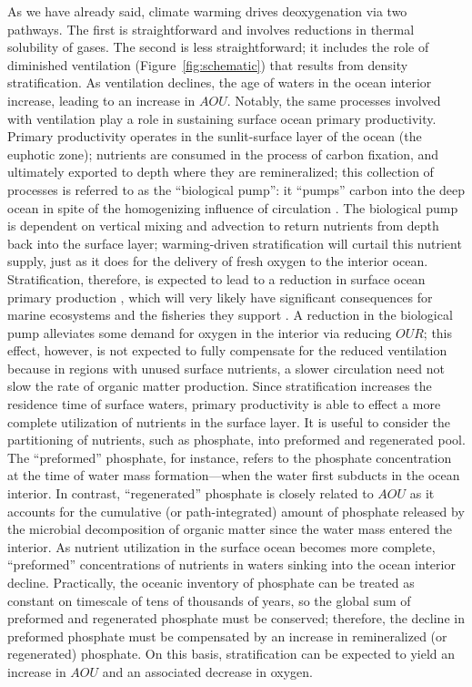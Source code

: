 \documentclass[draft,linenumbers]{report_chapter}
\begin{document}
As we have already said, climate warming drives deoxygenation via two pathways.
The first is straightforward and involves reductions in thermal solubility of gases.
The second is less straightforward; it includes the role of diminished ventilation (Figure~\ref{fig:schematic}) that results from density stratification.
As ventilation declines, the age of waters in the ocean interior increase, leading to an increase in $AOU$.
Notably, the same processes involved with ventilation play a role in sustaining surface ocean primary productivity.
Primary productivity operates in the sunlit-surface layer of the ocean (the euphotic zone); nutrients are consumed in the process of carbon fixation, and ultimately exported to depth where they are remineralized; this collection of processes is referred to as the ``biological pump'': it ``pumps'' carbon into the deep ocean in spite of the homogenizing influence of circulation \citep{Volk-Hoffert-1985}.
The biological pump is dependent on vertical mixing and advection to return nutrients from depth back into the surface layer; warming-driven stratification will curtail this nutrient supply, just as it does for the delivery of fresh oxygen to the interior ocean.
Stratification, therefore, is expected to lead to a reduction in surface ocean primary production \citep{Steinacher-Joos-etal-2010,Bopp-Resplandy-etal-2013}, which will very likely have significant consequences for marine ecosystems and the fisheries they support \citep{Stock-John-etal-2017}.
A reduction in the biological pump alleviates some demand for oxygen in the interior via reducing $OUR$; this effect, however, is not expected to fully compensate for the reduced ventilation because in regions with unused surface nutrients, a slower circulation need not slow the rate of organic matter production.
Since stratification increases the residence time of surface waters, primary productivity is able to effect a more complete utilization of nutrients in the surface layer.
It is useful to consider the partitioning of nutrients, such as phosphate, into preformed and regenerated pool.
The ``preformed'' phosphate, for instance, refers to the phosphate concentration at the time of water mass formation---when the water first subducts in the ocean interior.
In contrast, ``regenerated'' phosphate is closely related to $AOU$ as it accounts for the cumulative (or path-integrated) amount of phosphate released by the microbial decomposition of organic matter since the water mass entered the interior.
As nutrient utilization in the surface ocean becomes more complete, ``preformed'' concentrations of nutrients in waters sinking into the ocean interior decline.
Practically, the oceanic inventory of phosphate can be treated as constant on timescale of tens of thousands of years, so the global sum of preformed and regenerated phosphate must be conserved; therefore, the decline in preformed phosphate must be compensated by an increase in remineralized (or regenerated) phosphate.
On this basis, stratification can be expected to yield an increase in $AOU$ and an associated decrease in oxygen.
\end{document}
